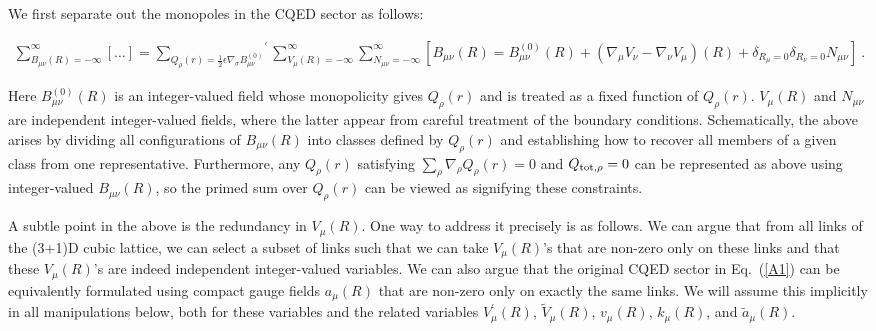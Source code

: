 \documentclass[prb,twocolumn]{revtex4-1}
\def\cJ{{J}}
\def\cQ{{Q}}
\def\Aext{A^{\rm ext}}
\def\hext{h^{\rm ext}}
\def\uu{B}
\def\MM{N}
\begin{document}

We first separate out the monopoles in the CQED sector as follows:
\begin{widetext}
\begin{eqnarray}
\sum_{\uu_{\mu\nu}(R) = -\infty}^\infty \!\!\!\!\!\! [\dots ] \!=\!\!\!
{\sum_{\cQ_\rho(r) = \frac{1}{2} \epsilon \nabla_\sigma \uu_{\mu\nu}^{(0)}}}^\prime \sum_{V_\mu(R) = -\infty}^\infty \sum_{\MM_{\mu\nu} = -\infty}^\infty 
[\uu_{\mu\nu}(R) = \uu_{\mu\nu}^{(0)}(R) + (\nabla_\mu V_\nu - \nabla_\nu V_\mu)(R) + \delta_{R_\mu = 0} \delta_{R_\nu = 0} \MM_{\mu\nu} ]~.
\label{umn}
\end{eqnarray}
\end{widetext}
Here $\uu_{\mu\nu}^{(0)}(R)$ is an integer-valued field whose monopolicity gives $\cQ_\rho(r)$ and is treated as a fixed function of $\cQ_\rho(r)$.  $V_\mu(R)$ and $\MM_{\mu\nu}$ are independent integer-valued fields, where the latter appear from careful treatment of the boundary conditions.  Schematically, the above arises by dividing all configurations of $\uu_{\mu\nu}(R)$ into classes defined by $\cQ_\rho(r)$ and establishing how to recover all members of a given class from one representative.  Furthermore, any $\cQ_\rho(r)$ satisfying $\sum_\rho \nabla_\rho \cQ_\rho(r) = 0$ and $\cQ_{{\rm tot}, \rho} = 0$ can be represented as above using integer-valued $\uu_{\mu\nu}(R)$, so the primed sum over $\cQ_\rho(r)$ can be viewed as signifying these constraints.  

A subtle point in the above is the redundancy in $V_\mu(R)$.  One way to address it precisely is as follows.  We can argue that from all links of the (3+1)D cubic lattice, we can select a subset of links such that we can take $V_\mu(R)$'s that are non-zero only on these links and that these $V_\mu(R)$'s are indeed independent integer-valued variables.  We can also argue that the original CQED sector in Eq.~(\ref{A1}) can be equivalently formulated using compact gauge fields $a_\mu(R)$ that are non-zero only on exactly the same links.  We will assume this implicitly in all manipulations below, both for these variables and the related variables $V_\mu^\prime(R)$, $\tilde{V}_\mu(R)$, $v_\mu(R)$, $k_{\mu}(R)$, and $\tilde{a}_\mu(R)$. 
\end{document}
